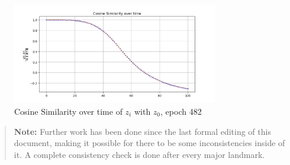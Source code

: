 \documentclass[a4paper,12pt]{article}
\begin{document}
\begin{figure}[h!]
	\centering
	\includegraphics[width=0.8\textwidth]{./Latent Plots/Figure_4.png}
	\caption{Cosine Similarity over time of $z_i$ with $z_0$, epoch 482}
	\label{fig:cosine-similarity}
\end{figure}

\begin{quote}
	\textbf{Note:} Further work has been done since the last formal editing of this document, making it possible for there to be some inconsistencies
	inside of it. A complete consistency check is done after every major landmark.
\end{quote}
\end{document}
